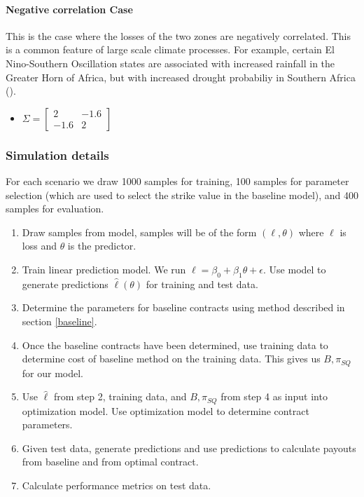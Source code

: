 \documentclass[11pt]{article}
\begin{document}
      \paragraph*{Negative correlation Case}
        This is the case where the losses of the two zones are negatively correlated. This is a common feature of large scale climate processes. For example, certain El Nino-Southern Oscillation states are associated with increased rainfall in the Greater Horn of Africa, but with increased drought probabiliy in Southern Africa (\cite{barrett2007poverty}). 
        \begin{itemize}
            \item $\Sigma = \begin{bmatrix}
                2 & -1.6 \\
                -1.6 & 2 
                \end{bmatrix} $
        \end{itemize}

    \subsubsection{Simulation details}
      For each scenario we draw 1000 samples for training, 100 samples for parameter selection (which are used to select the strike value in the baseline model), and 400 samples for evaluation.
      \begin{enumerate}
        \item Draw samples from model, samples will be of the form $(\ell,\theta)$ where $\ell$ is loss and $\theta$ is the predictor. 
        \item Train linear prediction model. We run $\ell = \beta_0 + \beta_1\theta +\epsilon$. Use model to generate predictions $\hat{\ell}(\theta)$ for training and test data. 
        \item Determine the parameters for baseline contracts using method described in section \ref{baseline}. 
        \item Once the baseline contracts have been determined, use training data to determine cost of baseline method on the training data. This gives us $B,\pi_{SQ}$ for our model. 
        \item Use $\hat{\ell}$ from step 2, training data, and $B, \pi_{SQ}$ from step 4 as input into optimization model. Use optimization  model to determine contract parameters. 
        \item Given test data, generate predictions and use predictions to calculate payouts from baseline and from optimal contract. 
        \item Calculate performance metrics on test data. 
      \end{enumerate}
\end{document}

